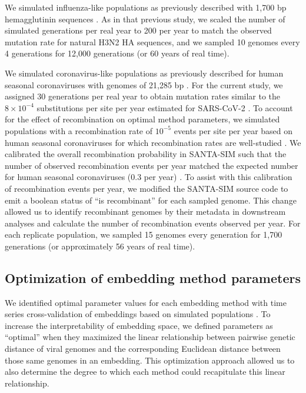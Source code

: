 \documentclass[10pt,letterpaper]{article}
\begin{document}
We simulated influenza-like populations as previously described with 1,700 bp hemagglutinin sequences \cite{Huddleston2020}.
As in that previous study, we scaled the number of simulated generations per real year to 200 per year to match the observed mutation rate for natural H3N2 HA sequences, and we sampled 10 genomes every 4 generations for 12,000 generations (or 60 years of real time).

We simulated coronavirus-like populations as previously described for human seasonal coronaviruses with genomes of 21,285 bp \cite{Muller2022}.
For the current study, we assigned 30 generations per real year to obtain mutation rates similar to the $8 \times 10^{-4}$ substitutions per site per year estimated for SARS-CoV-2 \cite{Rambaut2020}.
To account for the effect of recombination on optimal method parameters, we simulated populations with a recombination rate of $10^{-5}$ events per site per year based on human seasonal coronaviruses for which recombination rates are well-studied \cite{Muller2022,Carabelli2023}.
We calibrated the overall recombination probability in SANTA-SIM such that the number of observed recombination events per year matched the expected number for human seasonal coronaviruses (0.3 per year) \cite{Muller2022}.
To assist with this calibration of recombination events per year, we modified the SANTA-SIM source code to emit a boolean status of ``is recombinant'' for each sampled genome.
This change allowed us to identify recombinant genomes by their metadata in downstream analyses and calculate the number of recombination events observed per year.
For each replicate population, we sampled 15 genomes every generation for 1,700 generations (or approximately 56 years of real time).

\subsection*{Optimization of embedding method parameters}

We identified optimal parameter values for each embedding method with time series cross-validation of embeddings based on simulated populations \cite{HyndmanAthanasopoulos2021}.
To increase the interpretability of embedding space, we defined parameters as ``optimal'' when they maximized the linear relationship between pairwise genetic distance of viral genomes and the corresponding Euclidean distance between those same genomes in an embedding.
This optimization approach allowed us to also determine the degree to which each method could recapitulate this linear relationship.
\end{document}
